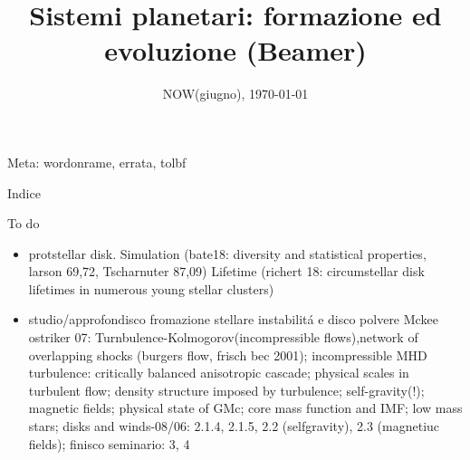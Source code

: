 \documentclass[10pt,xcolor={usenames},fleqn,mathserif,serif]{beamer}
\title{Sistemi planetari: formazione ed evoluzione (Beamer)}
\subtitle{}
\date{NOW(giugno), \today}
\begin{document}


\begin{frame}
  \titlepage
  Meta: wordonrame, errata, tolbf
\end{frame}


\begin{frame}[allowframebreaks]{Indice}
\tableofcontents[onlyparts]
\end{frame}

\begin{wordonframe}{To do}
\begin{itemize}
\item protstellar disk.
Simulation (bate18: diversity and statistical properties, larson 69,72, Tscharnuter 87,09)
Lifetime (richert 18: circumstellar disk lifetimes in numerous young stellar clusters)
\item studio/approfondisco fromazione stellare instabilit\'a e disco polvere
Mckee ostriker 07: Turnbulence-Kolmogorov(incompressible flows),network of overlapping shocks (burgers flow, frisch bec 2001); incompressible MHD turbulence: critically balanced anisotropic cascade; physical scales in turbulent flow; density structure imposed by turbulence; self-gravity(!); magnetic fields; physical state of GMc; core mass function and IMF; low mass stars; disks and winds-08/06: 2.1.4, 2.1.5, 2.2 (selfgravity), 2.3 (magnetiuc fields); finisco seminario: 3, 4

\end{itemize}
\end{wordonframe}
\end{document}
